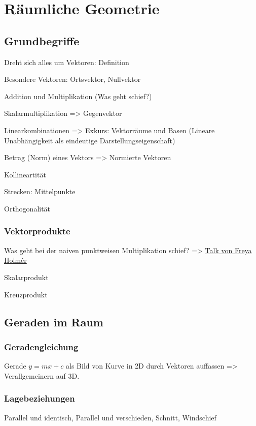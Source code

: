 \chapter{Räumliche Geometrie}

\section{Grundbegriffe}
Dreht sich alles um Vektoren: Definition

Besondere Vektoren: Ortsvektor, Nullvektor

Addition und Multiplikation (Was geht schief?)

Skalarmultiplikation => Gegenvektor

Linearkombinationen => Exkurs: Vektorräume und Basen (Lineare Unabhängigkeit als eindeutige Darstellungseigenschaft)

Betrag (Norm) eines Vektors => Normierte Vektoren 

Kollineartität

Strecken: Mittelpunkte

Orthogonalität

\subsection{Vektorprodukte}
Was geht bei der naiven punktweisen Multiplikation schief? => \href{https://www.youtube.com/watch?v=htYh-Tq7ZBI}{Talk von Freya Holmér}

Skalarprodukt

Kreuzprodukt

\section{Geraden im Raum}

\subsection{Geradengleichung}
Gerade \(y = mx+c\) als Bild von Kurve in 2D durch Vektoren auffassen => Verallgemeinern auf 3D. 

\subsection{Lagebeziehungen}
Parallel und identisch, Parallel und verschieden, Schnitt, Windschief

\begin{definition}[Lagebeziehungen]
    
\end{definition}

